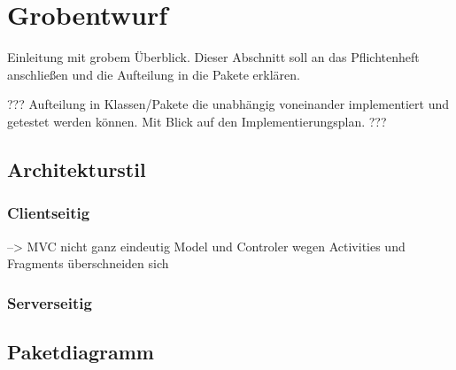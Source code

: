 \section{Grobentwurf}
Einleitung mit grobem Überblick. Dieser Abschnitt soll an das Pflichtenheft anschließen und die Aufteilung in die Pakete erklären.

???
Aufteilung in Klassen/Pakete die unabhängig voneinander implementiert und getestet werden können. Mit Blick auf den Implementierungsplan.
???
\subsection{Architekturstil}

\subsubsection{Clientseitig}
--> MVC nicht ganz eindeutig Model und Controler wegen Activities und Fragments überschneiden sich

\subsubsection{Serverseitig}

\subsection{Paketdiagramm}





